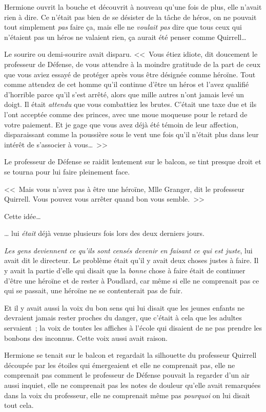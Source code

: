 Hermione ouvrit la bouche et découvrit à nouveau qu'une fois de plus, elle n'avait rien à dire. Ce n'était pas bien de se désister de la tâche de héros, on ne pouvait tout simplement \emph{pas} faire ça, mais elle ne \emph{voulait pas} dire que tous ceux qui n'étaient pas un héros ne valaient rien, ça aurait été penser comme Quirrell…

Le sourire ou demi-sourire avait disparu. <<~Vous étiez idiote, dit doucement le professeur de Défense, de vous attendre à la moindre gratitude de la part de ceux que vous aviez essayé de protéger après vous être désignée comme héroïne. Tout comme attendez de cet homme qu'il continue d'être un héros et l'avez qualifié d'horrible parce qu'il s'est arrêté, alors que mille autres n'ont jamais levé un doigt. Il était \emph{attendu} que vous combattiez les brutes. C'était une taxe due et ils l'ont acceptée comme des princes, avec une moue moqueuse pour le retard de votre paiement. Et je gage que vous avez déjà été témoin de leur affection, disparaissant comme la poussière sous le vent une fois qu'il n'était plus dans leur intérêt de s'associer à vous…~>>

Le professeur de Défense se raidit lentement sur le balcon, se tint presque droit et se tourna pour lui faire pleinement face.

<<~Mais vous n'avez pas à être une héroïne, Mlle Granger, dit le professeur Quirrell. Vous pouvez vous arrêter quand bon vous semble.~>>

Cette idée…

… lui \emph{était} déjà venue plusieurs fois lors des deux derniers jours.

\emph{Les gens deviennent ce qu'ils sont censés devenir en faisant ce qui est juste}, lui avait dit le directeur. Le problème était qu'il y avait deux choses justes à faire. Il y avait la partie d'elle qui disait que la \emph{bonne} chose à faire était de continuer d'être une héroïne et de rester à Poudlard, car même si elle ne comprenait pas ce qui se passait, une héroïne ne se contenterait pas de fuir.

Et il y avait aussi la voix du bon sens qui lui disait que les jeunes enfants ne devraient jamais rester proches du danger, que c'était à cela que les adultes servaient~; la voix de toutes les affiches à l'école qui disaient de ne pas prendre les bonbons des inconnus. Cette voix aussi avait raison.

Hermione se tenait sur le balcon et regardait la silhouette du professeur Quirrell découpée par les étoiles qui émergeaient et elle ne comprenait pas, elle ne comprenait pas comment le professeur de Défense pouvait la regarder d'un air aussi inquiet, elle ne comprenait pas les notes de douleur qu'elle avait remarquées dans la voix du professeur, elle ne comprenait même pas \emph{pourquoi} on lui disait tout cela.

